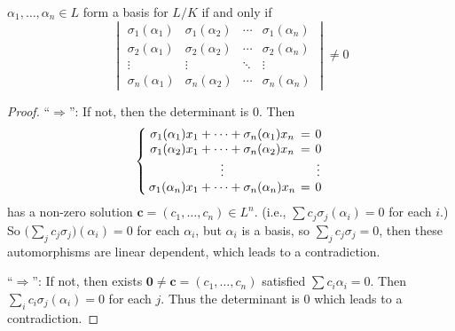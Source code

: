 \begin{lemma} \label{lemma:basis-iff-det-neq-0}
  $\alpha_1, \dots, \alpha_n \in L$ form a basis for $L/K$ if and only if
  \[
    \begin{vmatrix}
      \sigma_1(\alpha_1) & \sigma_1(\alpha_2) & \cdots & \sigma_1(\alpha_n) \\
      \sigma_2(\alpha_1) & \sigma_2(\alpha_2) & \cdots & \sigma_2(\alpha_n) \\
      \vdots & \vdots & \ddots & \vdots \\
      \sigma_n(\alpha_1) & \sigma_n(\alpha_2) & \cdots & \sigma_n(\alpha_n)
    \end{vmatrix} \neq 0
  \]

  \begin{proof}
    ``$\Rightarrow$'': If not, then the determinant is $0$. Then
    \[ \left\{
        \arraycolsep=2pt
        \begin{array}{ccc}
          \sigma_1(\alpha_1) x_1 + \dots + \sigma_n(\alpha_1) x_n &=& 0 \\
          \sigma_1(\alpha_2) x_1 + \dots + \sigma_n(\alpha_2) x_n &=& 0 \\
          \vdots & & \vdots \\
          \sigma_1(\alpha_n) x_1 + \dots + \sigma_n(\alpha_n) x_n &=& 0
        \end{array}
      \right.
    \]
    has a non-zero solution $\bm{c} = (c_1, \dots, c_n) \in L^n$. (i.e., $\sum c_j \sigma_j(\alpha_i) = 0$
    for each $i$.) So $\big( \sum_{j} c_j \sigma_j \big)(\alpha_i) = 0$ for each $\alpha_i$,
    but $\alpha_i$ is a basis, so $\sum_{j} c_j \sigma_j = 0$, then these automorphisms
    are linear dependent, which leads to a contradiction.

    ``$\Rightarrow$'': If not, then exists $\bm{0} \neq \bm{c} = (c_1, \dots, c_n)$
    satisfied $\sum c_i \alpha_i = 0$. Then $\sum_i c_i \sigma_j(\alpha_i) = 0$
    for each $j$. Thus the determinant is $0$ which leads to a contradiction.
  \end{proof}
\end{lemma}

